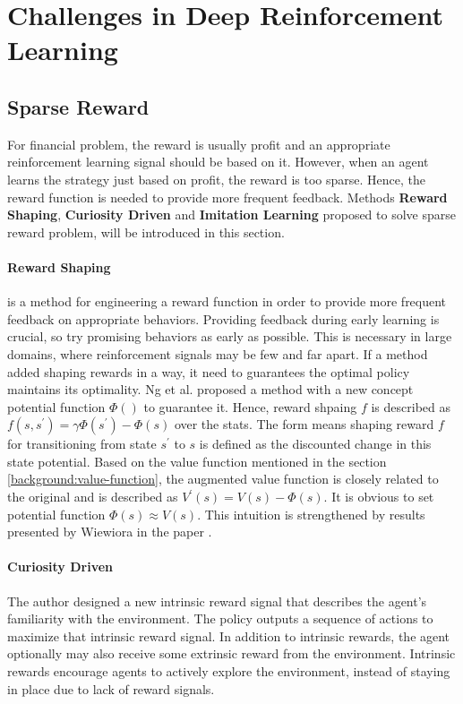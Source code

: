 \section{Challenges in Deep Reinforcement Learning}

\subsection{Sparse Reward} \label{related-work:sparse-reward}
For financial problem, the reward is usually profit and an appropriate reinforcement learning signal should be based on it. However, when an agent learns the strategy just based on profit, the reward is too sparse. Hence, the reward function is needed to provide more frequent feedback. Methods \textbf{Reward Shaping},\textbf{ Curiosity Driven} and \textbf{Imitation Learning} proposed to solve sparse reward problem, will be introduced in this section.

\paragraph{Reward Shaping\parencite{Wiewiora2010}} is a method for engineering a reward function in order to provide more frequent feedback on appropriate behaviors. Providing feedback during early learning is crucial, so try promising behaviors as early as possible. This is necessary in large domains, where reinforcement signals may be few and far apart. If a method added shaping rewards in a way, it need to guarantees the optimal policy maintains its optimality. Ng et al. proposed a method with a new concept potential function $\Phi()$ to guarantee it. Hence, reward shpaing $f$ is described as $f(s, s^{\prime}) = \gamma\Phi(s^{\prime}) - \Phi(s)$ over the stats\parencite{Ng1999PolicyIU}. The form means shaping reward $f$ for transitioning from state $s^{\prime}$ to $s$ is defined as the discounted change in this state potential. Based on the value function mentioned in the section \ref{background:value-function}, the augmented value function is closely related to the original and is described as $V^{\prime}(s) = V(s) - \Phi(s)$. It is obvious to set potential function $\Phi(s) \approx V(s)$. This intuition is strengthened by results presented by Wiewiora in the paper \parencite{Wiewiora2003}.

 
\paragraph{Curiosity Driven \parencite{pathakICMl17curiosity}} The author designed a new intrinsic reward signal that describes the agent’s familiarity with the environment. The policy outputs a sequence of actions to maximize that intrinsic reward signal. In addition to intrinsic rewards, the agent optionally may also receive some extrinsic reward from the environment. Intrinsic rewards encourage agents to actively explore the environment, instead of staying in place due to lack of reward signals.

